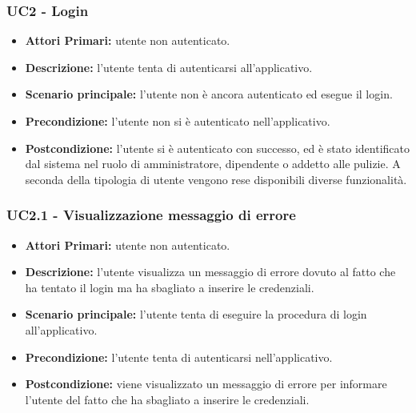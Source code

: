 \subsubsection{ UC2 - Login}
\begin{itemize}
           	\item\textbf{Attori Primari:} utente non autenticato.
           	\item\textbf{Descrizione:} l’utente tenta di autenticarsi all'applicativo.
           	\item\textbf{Scenario principale:} l’utente non è ancora autenticato ed esegue il login.
           	\item\textbf{Precondizione:} l’utente non si è autenticato nell'applicativo. 
           	\item\textbf{Postcondizione:} l’utente si è autenticato con successo, ed è stato identificato dal sistema
           	nel ruolo di amministratore, dipendente o addetto alle pulizie. A seconda della tipologia di utente vengono rese
           	disponibili diverse funzionalità.
\end{itemize}

\subsubsection{ UC2.1 - Visualizzazione messaggio di errore}
\begin{itemize}
	\item\textbf{Attori Primari:} utente non autenticato.
	\item\textbf{Descrizione:} l'utente visualizza un messaggio di errore dovuto al fatto che ha tentato il login ma ha sbagliato a inserire le credenziali.
	\item\textbf{Scenario principale:} l’utente tenta di eseguire la procedura di login all'applicativo.
	\item\textbf{Precondizione:} l'utente tenta di autenticarsi nell'applicativo.
	\item\textbf{Postcondizione:} viene visualizzato un messaggio di errore per informare l'utente del fatto che ha sbagliato a inserire le credenziali.
\end{itemize}
